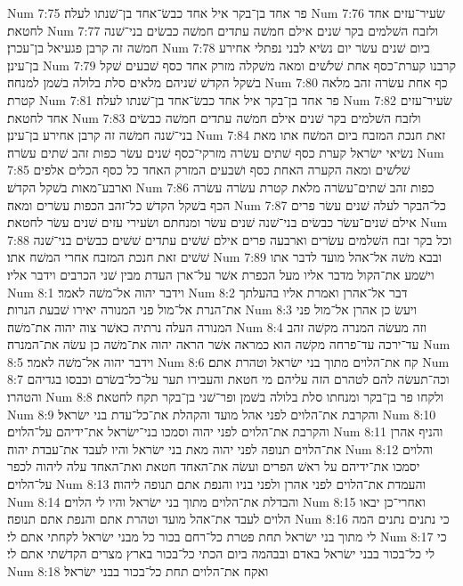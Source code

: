 Num 7:75  פר אחד בן־בקר איל אחד כבשׂ־אחד בן־שׁנתו לעלה׃
Num 7:76  שׂעיר־עזים אחד לחטאת׃
Num 7:77  ולזבח השׁלמים בקר שׁנים אילם חמשׁה עתדים חמשׁה כבשׂים בני־שׁנה חמשׁה זה קרבן פגעיאל בן־עכרן׃
Num 7:78  ביום שׁנים עשׂר יום נשׂיא לבני נפתלי אחירע בן־עינן׃
Num 7:79  קרבנו קערת־כסף אחת שׁלשׁים ומאה משׁקלה מזרק אחד כסף שׁבעים שׁקל בשׁקל הקדשׁ שׁניהם מלאים סלת בלולה בשׁמן למנחה׃
Num 7:80  כף אחת עשׂרה זהב מלאה קטרת׃
Num 7:81  פר אחד בן־בקר איל אחד כבשׂ־אחד בן־שׁנתו לעלה׃
Num 7:82  שׂעיר־עזים אחד לחטאת׃
Num 7:83  ולזבח השׁלמים בקר שׁנים אילם חמשׁה עתדים חמשׁה כבשׂים בני־שׁנה חמשׁה זה קרבן אחירע בן־עינן׃
Num 7:84  זאת חנכת המזבח ביום המשׁח אתו מאת נשׂיאי ישׂראל קערת כסף שׁתים עשׂרה מזרקי־כסף שׁנים עשׂר כפות זהב שׁתים עשׂרה׃
Num 7:85  שׁלשׁים ומאה הקערה האחת כסף ושׁבעים המזרק האחד כל כסף הכלים אלפים וארבע־מאות בשׁקל הקדשׁ׃
Num 7:86  כפות זהב שׁתים־עשׂרה מלאת קטרת עשׂרה עשׂרה הכף בשׁקל הקדשׁ כל־זהב הכפות עשׂרים ומאה׃
Num 7:87  כל־הבקר לעלה שׁנים עשׂר פרים אילם שׁנים־עשׂר כבשׂים בני־שׁנה שׁנים עשׂר ומנחתם ושׂעירי עזים שׁנים עשׂר לחטאת׃
Num 7:88  וכל בקר זבח השׁלמים עשׂרים וארבעה פרים אילם שׁשׁים עתדים שׁשׁים כבשׂים בני־שׁנה שׁשׁים זאת חנכת המזבח אחרי המשׁח אתו׃
Num 7:89  ובבא משׁה אל־אהל מועד לדבר אתו וישׁמע את־הקול מדבר אליו מעל הכפרת אשׁר על־ארן העדת מבין שׁני הכרבים וידבר אליו׃
Num 8:1  וידבר יהוה אל־משׁה לאמר׃
Num 8:2  דבר אל־אהרן ואמרת אליו בהעלתך את־הנרת אל־מול פני המנורה יאירו שׁבעת הנרות׃
Num 8:3  ויעשׂ כן אהרן אל־מול פני המנורה העלה נרתיה כאשׁר צוה יהוה את־משׁה׃
Num 8:4  וזה מעשׂה המנרה מקשׁה זהב עד־ירכה עד־פרחה מקשׁה הוא כמראה אשׁר הראה יהוה את־משׁה כן עשׂה את־המנרה׃
Num 8:5  וידבר יהוה אל־משׁה לאמר׃
Num 8:6  קח את־הלוים מתוך בני ישׂראל וטהרת אתם׃
Num 8:7  וכה־תעשׂה להם לטהרם הזה עליהם מי חטאת והעבירו תער על־כל־בשׂרם וכבסו בגדיהם והטהרו׃
Num 8:8  ולקחו פר בן־בקר ומנחתו סלת בלולה בשׁמן ופר־שׁני בן־בקר תקח לחטאת׃
Num 8:9  והקרבת את־הלוים לפני אהל מועד והקהלת את־כל־עדת בני ישׂראל׃
Num 8:10  והקרבת את־הלוים לפני יהוה וסמכו בני־ישׂראל את־ידיהם על־הלוים׃
Num 8:11  והניף אהרן את־הלוים תנופה לפני יהוה מאת בני ישׂראל והיו לעבד את־עבדת יהוה׃
Num 8:12  והלוים יסמכו את־ידיהם על ראשׁ הפרים ועשׂה את־האחד חטאת ואת־האחד עלה ליהוה לכפר על־הלוים׃
Num 8:13  והעמדת את־הלוים לפני אהרן ולפני בניו והנפת אתם תנופה ליהוה׃
Num 8:14  והבדלת את־הלוים מתוך בני ישׂראל והיו לי הלוים׃
Num 8:15  ואחרי־כן יבאו הלוים לעבד את־אהל מועד וטהרת אתם והנפת אתם תנופה׃
Num 8:16  כי נתנים נתנים המה לי מתוך בני ישׂראל תחת פטרת כל־רחם בכור כל מבני ישׂראל לקחתי אתם לי׃
Num 8:17  כי לי כל־בכור בבני ישׂראל באדם ובבהמה ביום הכתי כל־בכור בארץ מצרים הקדשׁתי אתם לי׃
Num 8:18  ואקח את־הלוים תחת כל־בכור בבני ישׂראל׃
